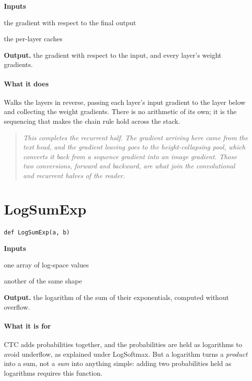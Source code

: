 \noindent\textbf{Inputs}
\begin{description}[leftmargin=2.2em,style=nextline,font=\normalfont\ttfamily]\setlength\itemsep{1pt}
  \item[{dout}] \normalfont the gradient with respect to the final output
  \item[{caches}] \normalfont the per-layer caches
\end{description}

\noindent\textbf{Output.} the gradient with respect to the input, and every layer's weight gradients.


\paragraph{What it does}
Walks the layers in reverse, passing each layer's input gradient to the layer below and collecting the weight gradients. There is no arithmetic of its own; it is the sequencing that makes the chain rule hold across the stack.


\begin{quote}\small\itshape This completes the recurrent half. The gradient arriving here came from the text head, and the gradient leaving goes to the height-collapsing pool, which converts it back from a sequence gradient into an image gradient. Those two conversions, forward and backward, are what join the convolutional and recurrent halves of the reader.\end{quote}

\section{LogSumExp}
\begin{lstlisting}[style=sig]
def LogSumExp(a, b)
\end{lstlisting}

\noindent\textbf{Inputs}
\begin{description}[leftmargin=2.2em,style=nextline,font=\normalfont\ttfamily]\setlength\itemsep{1pt}
  \item[{a}] \normalfont one array of log-space values
  \item[{b}] \normalfont another of the same shape
\end{description}

\noindent\textbf{Output.} the logarithm of the sum of their exponentials, computed without overflow.


\paragraph{What it is for}
CTC adds probabilities together, and the probabilities are held as logarithms to avoid underflow, as explained under LogSoftmax. But a logarithm turns a \emph{product} into a sum, not a \emph{sum} into anything simple: adding two probabilities held as logarithms requires this function.


